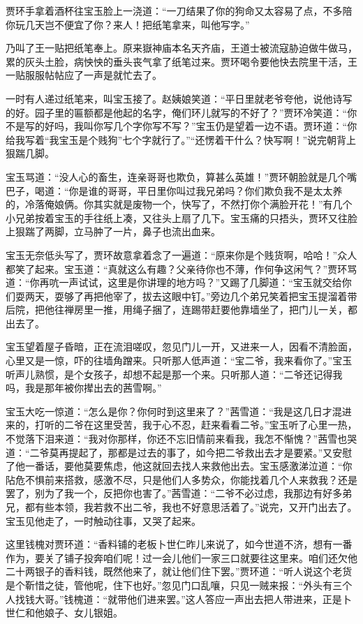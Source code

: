 \documentclass[12pt,oneside]{book}
\begin{document}
贾环手拿着酒杯往宝玉脸上一浇道：“一刀结果了你的狗命又太容易了点，不多陪你玩几天岂不便宜了你？来人！把纸笔拿来，叫他写字。”

乃叫了王一贴把纸笔奉上。原来嶽神庙本名天齐庙，王道士被流寇胁迫做牛做马，累的灰头土脸，病怏怏的垂头丧气拿了纸笔过来。贾环喝令要他快去院里干活，王一贴服服帖帖应了一声是就忙去了。

一时有人递过纸笔来，叫宝玉接了。赵姨娘笑道：“平日里就老爷夸他，说他诗写的好。园子里的匾额都是他起的名字，俺们环儿就写的不好了？”贾环冷笑道：“你不是写的好吗，我叫你写几个字你写不写？”宝玉仍是望着一边不语。贾环道：“你给我写着“我宝玉是个贱狗”七个字就行了。”“还愣着干什么？快写啊！”说完朝背上狠踹几脚。

宝玉骂道：“没人心的畜生，连亲哥哥也欺负，算甚么英雄！”贾环朝脸就是几个嘴巴子，喝道：“你是谁的哥哥，平日里你叫过我兄弟吗？你们欺负我不是太太养的，冷落俺娘俩。你其实就是废物一个，快写了，不然打你个满脸开花！”有几个小兄弟按着宝玉的手往纸上凑，又往头上扇了几下。宝玉痛的只捂头，贾环又往脸上狠踹了两脚，立马肿了一片，鼻子也流出血来。

宝玉无奈低头写了，贾环故意拿着念了一遍道：“原来你是个贱货啊，哈哈！”众人都笑了起来。宝玉道：“真就这么有趣？父亲待你也不薄，作何争这闲气？”贾环骂道：“你再吭一声试试，这里是你讲理的地方吗？”又踢了几脚道：“宝玉就交给你们耍两天，耍够了再把他宰了，拔去这眼中钉。”旁边几个弟兄笑着把宝玉提溜着带后院，把他往禅房里一推，用绳子捆了，连踢带赶要他靠墙坐了，把门儿一关，都出去了。

宝玉望着屋子昏暗，正在流泪嗟叹，忽见门儿一开，又进来一人，因看不清脸面，心里又是一惊，吓的往墙角蹭来。只听那人低声道：“宝二爷，我来看你了。”宝玉听声儿熟惯，是个女孩子，却想不起是那一个来。只听那人道：“二爷还记得我吗，我是那年被你撵出去的茜雪啊。”

宝玉大吃一惊道：“怎么是你？你何时到这里来了？”茜雪道：“我是这几日才混进来的，打听的二爷在这里受苦，我于心不忍，赶来看看二爷。”宝玉听了心里一热，不觉落下泪来道：“我对你那样，你还不忘旧情前来看我，我怎不惭愧？”茜雪也哭道：“二爷莫再提起了，那都是过去的事了，如今把二爷救出去才是要紧。”又安慰了他一番话，要他莫要焦虑，他这就回去找人来救他出去。宝玉感激涕泣道：“你阽危不惧前来搭救，感激不尽，只是他们人多势众，你能找着几个人来救我？还是罢了，别为了我一个，反把你也害了。”茜雪道：“二爷不必过虑，我那边有好多弟兄，都有些本领，我若救不出二爷，我也不好意思活着了。”说完，又开门出去了。宝玉见他走了，一时触动往事，又哭了起来。

这里钱槐对贾环道：“香料铺的老板卜世仁昨儿来说了，如今世道不济，想有一番作为，要关了铺子投奔咱们呢！过一会儿他们一家三口就要往这里来。咱们还欠他二十两银子的香料钱，既然他来了，就让他们住下罢。”贾环道：“听人说这个老货是个靳惜之徒，管他呢，住下也好。”忽见门口乱嚷，只见一贼来报：“外头有三个人找钱大哥。”钱槐道：“就带他们进来罢。”这人答应一声出去把人带进来，正是卜世仁和他娘子、女儿银姐。
\end{document}
